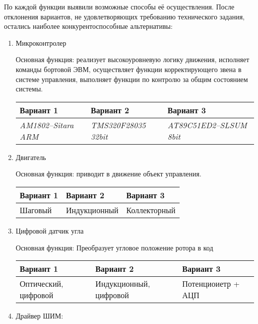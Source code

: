 По каждой функции выявили возможные способы её осуществления.
После отклонения вариантов, не удовлетворяющих требованию технического
задания, остались наиболее конкурентоспособные альтернативы:

\begin{enumerate}
    \item Микроконтролер

        Основная функция: реализует высокоуровневую логику движения,
        исполняет команды бортовой ЭВМ, осуществляет функции корректирующего
        звена в системе управления, выполняет функции по контролю за общим
        состоянием системы.

        \begin{tabular}{|p{3.5cm}|p{3.5cm}|p{3.5cm}|}
            \hline
            Вариант 1 & Вариант 2 & Вариант 3 \\
            \hline
            \textit{AM1802--Sitara ARM} &
            \textit{TMS320F28035 32bit} &
            \textit{AT89C51ED2--SLSUM 8bit} \\
            \hline
        \end{tabular}

    \item Двигатель

        Основная функция: приводит в движение объект управления.

        \begin{tabular}{|p{3.5cm}|p{3.5cm}|p{3.5cm}|}
            \hline
            Вариант 1 & Вариант 2 & Вариант 3 \\
            \hline
            Шаговый &
            Индукционный &
            Коллекторный \\
            \hline
        \end{tabular}

    \item Цифровой датчик угла

        Основная функция: Преобразует угловое положение ротора в код

        \begin{tabular}{|p{3.5cm}|p{3.5cm}|p{3.5cm}|}
            \hline
            Вариант 1 & Вариант 2 & Вариант 3 \\
            \hline
            Оптический, цифровой &
            Индукционный, цифровой &
            Потенциоиетр + АЦП \\
            \hline
        \end{tabular}

    \item Драйвер ШИМ:


\end{enumerate}

